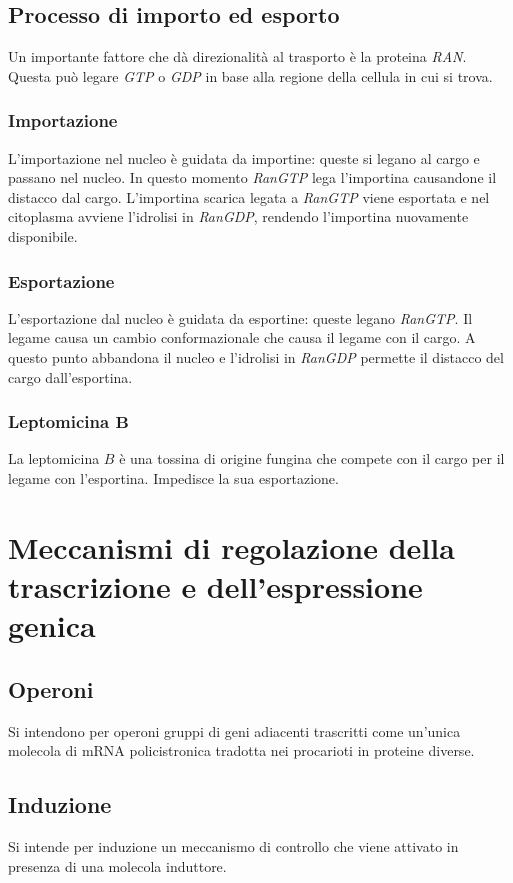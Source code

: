	\subsection{Processo di importo ed esporto}
	Un importante fattore che d\`a direzionalit\`a al trasporto \`e la proteina \emph{RAN}.
	Questa pu\`o legare \emph{GTP} o \emph{GDP} in base alla regione della cellula in cui si trova.

		\subsubsection{Importazione}
		L'importazione nel nucleo \`e guidata da importine: queste si legano al cargo e passano nel nucleo.
		In questo momento \emph{RanGTP} lega l'importina causandone il distacco dal cargo.
		L'importina scarica legata a \emph{RanGTP} viene esportata e nel citoplasma avviene l'idrolisi in \emph{RanGDP}, rendendo l'importina nuovamente disponibile.

		\subsubsection{Esportazione}
		L'esportazione dal nucleo \`e guidata da esportine: queste legano \emph{RanGTP}.
		Il legame causa un cambio conformazionale che causa il legame con il cargo.
		A questo punto abbandona il nucleo e l'idrolisi in \emph{RanGDP} permette il distacco del cargo dall'esportina.

		\subsubsection{Leptomicina $\mathbf{B}$}
		La leptomicina $B$ \`e una tossina di origine fungina che compete con il cargo per il legame con l'esportina.
		Impedisce la sua esportazione.

\section{Meccanismi di regolazione della trascrizione e dell'espressione genica}

	\subsection{Operoni}
	Si intendono per operoni gruppi di geni adiacenti trascritti come un'unica molecola di mRNA policistronica tradotta nei procarioti in proteine diverse.

	\subsection{Induzione}
	Si intende per induzione un meccanismo di controllo che viene attivato in presenza di una molecola induttore.

